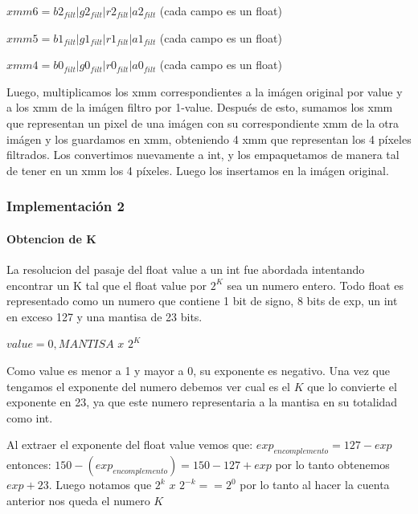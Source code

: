 \documentclass[a4paper]{article}
\begin{document}
\vspace*{0.3cm}

$xmm6 = b2_{filt} | g2_{filt} | r2_{filt} | a2_{filt}$   (cada campo es un float)

\vspace*{0.3cm}

$xmm5 = b1_{filt} | g1_{filt} | r1_{filt} | a1_{filt}$   (cada campo es un float)

\vspace*{0.3cm}

$xmm4 = b0_{filt} | g0_{filt} | r0_{filt} | a0_{filt}$   (cada campo es un float)

\vspace*{0.3cm}

Luego, multiplicamos los xmm correspondientes a la imágen original por value y a los xmm de la imágen filtro por 1-value. Después de esto, sumamos los xmm que representan un pixel de una imágen con su correspondiente xmm de la otra imágen y los guardamos en xmm, obteniendo 4 xmm que representan los 4 píxeles filtrados. Los convertimos nuevamente a int, y los empaquetamos de manera tal de tener en un xmm los 4 píxeles. Luego los insertamos en la imágen original.

\vspace*{0.3cm}

\subsubsection{Implementación 2}

\paragraph*{Obtencion de K}
	La resolucion del pasaje del float value a un int fue abordada intentando encontrar un K tal que el float value por $2^K$ sea un numero entero.
	Todo float es representado como un numero que contiene 1 bit de signo, 8 bits de exp, un int en exceso 127 y una mantisa de 23 bits.

	$value=0,MANTISA$ $x$ $2^K$

Como value es menor a 1 y mayor a 0, su exponente es negativo.
Una vez que tengamos el exponente del numero debemos ver cual es el $K$ que lo convierte el exponente en 23, ya que este numero representaria a la mantisa en su totalidad como int.
	
Al extraer el exponente del float value vemos que:
$exp_{encomplemento}=127-exp$
entonces:
$150-(exp_{encomplemento}) = 150-127 + exp$
por lo tanto obtenemos $exp + 23$. 
Luego notamos que $2^k$ $x$ $2^{-k} == 2^0$
por lo tanto al hacer la cuenta anterior nos queda el numero $K$
\end{document}
